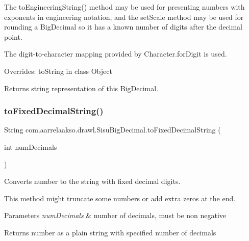 The to\+Engineering\+String() method may be used for presenting numbers with exponents in engineering notation, and the set\+Scale method may be used for rounding a Big\+Decimal so it has a known number of digits after the decimal point. 

The digit-\/to-\/character mapping provided by Character.\+for\+Digit is used. 

Overrides\+: to\+String in class Object

\begin{DoxyReturn}{Returns}
string representation of this Big\+Decimal. 
\end{DoxyReturn}
\mbox{\label{classcom_1_1aarrelaakso_1_1drawl_1_1_sisu_big_decimal_aa50e4eab549ecda56977c2480674055b}} 
\subsubsection{\texorpdfstring{to\+Fixed\+Decimal\+String()}{toFixedDecimalString()}}
{\footnotesize\ttfamily String com.\+aarrelaakso.\+drawl.\+Sisu\+Big\+Decimal.\+to\+Fixed\+Decimal\+String (\begin{DoxyParamCaption}\item[{int}]{num\+Decimals }\end{DoxyParamCaption})\hspace{0.3cm}{\ttfamily [protected]}}



Converts number to the string with fixed decimal digits. 

This method might truncate some numbers or add extra zeros at the end.


\begin{DoxyParams}{Parameters}
{\em num\+Decimals} & number of decimals, must be non negative \\
\hline
\end{DoxyParams}
\begin{DoxyReturn}{Returns}
number as a plain string with specified number of decimals 
\end{DoxyReturn}
\mbox{\label{classcom_1_1aarrelaakso_1_1drawl_1_1_sisu_big_decimal_aa1fdb9a9086d8a7a0c75f7b2acbf4931}} 
